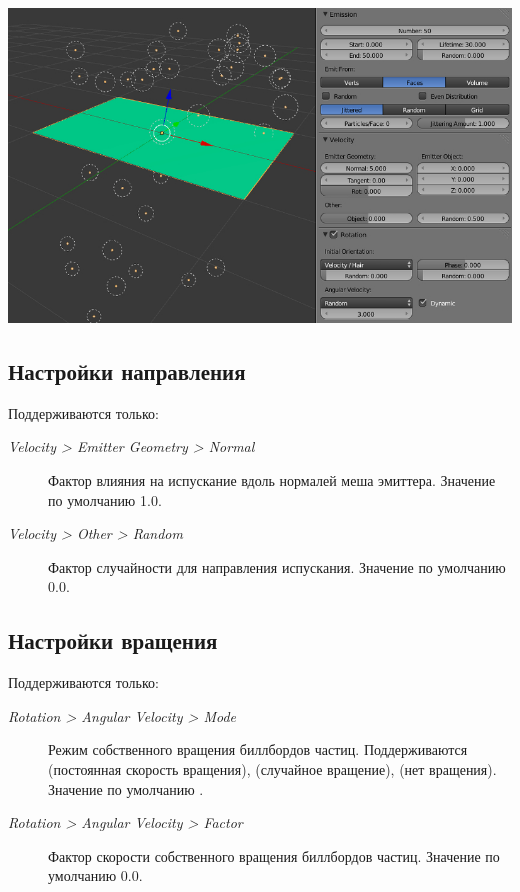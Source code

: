 \documentclass[a4paper,12pt,oneside]{sphinxmanual}
\begin{document}
{\hfill\includegraphics[width=1.000\linewidth]{particles_settings.jpg}\hfill}


\subsection{Настройки направления}
\label{particles:id8}
Поддерживаются только:
\begin{description}
\item[{\emph{Velocity \textgreater{} Emitter Geometry \textgreater{} Normal}}] \leavevmode
Фактор влияния на испускание вдоль нормалей меша эмиттера. Значение по умолчанию 1.0.

\item[{\emph{Velocity \textgreater{} Other \textgreater{} Random}}] \leavevmode
Фактор случайности для направления испускания. Значение по умолчанию 0.0.

\end{description}


\subsection{Настройки вращения}
\label{particles:id9}
Поддерживаются только:
\begin{description}
\item[{\emph{Rotation \textgreater{} Angular Velocity \textgreater{} Mode}}] \leavevmode
Режим собственного вращения биллбордов частиц. Поддерживаются  (постоянная скорость вращения),  (случайное вращение),  (нет вращения). Значение по умолчанию .

\item[{\emph{Rotation \textgreater{} Angular Velocity \textgreater{} Factor}}] \leavevmode
Фактор скорости собственного вращения биллбордов частиц. Значение по умолчанию 0.0.

\end{description}
\end{document}
